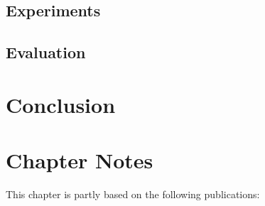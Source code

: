 \subsection{Experiments}

\subsection{Evaluation}

\section{Conclusion}

\section*{Chapter Notes}
This chapter is partly based on the following publications:
